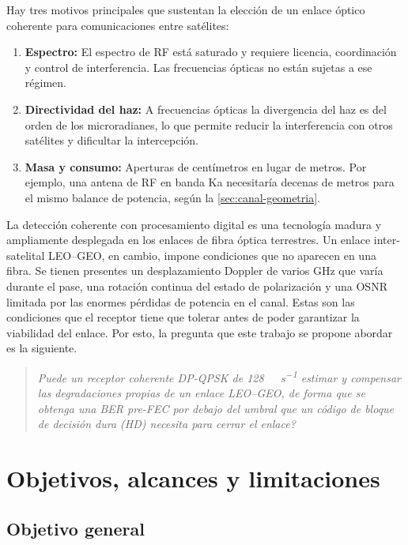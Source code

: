 Hay tres motivos principales que sustentan la elecci\'on de un enlace \'optico
coherente para comunicaciones entre sat\'elites:

\begin{enumerate}
  \item \textbf{Espectro:} El espectro de RF est\'a saturado y requiere
        licencia, coordinaci\'on y control de interferencia. Las frecuencias
        \'opticas no est\'an sujetas a ese r\'egimen.
  \item \textbf{Directividad del haz:} A frecuencias \'opticas la divergencia
        del haz es del orden de los microradianes, lo que permite reducir la
        interferencia con otros sat\'elites y dificultar la intercepci\'on.
  \item \textbf{Masa y consumo:} Aperturas de cent\'imetros en lugar de metros.
        Por ejemplo, una antena de RF en banda Ka necesitar\'ia decenas de
        metros para el mismo balance de potencia, seg\'un la
        \cref{sec:canal-geometria}.
\end{enumerate}

La detecci\'on coherente con procesamiento digital es una tecnolog\'ia madura y
ampliamente desplegada en los enlaces de fibra \'optica terrestres. Un enlace inter-satelital LEO--GEO, en cambio, impone condiciones
que no aparecen en una fibra. Se tienen presentes un desplazamiento Doppler de
varios \si{\giga\hertz} que var\'ia durante el pase, una rotaci\'on continua
del estado de polarizaci\'on y una OSNR limitada por las enormes p\'erdidas de
potencia en el canal. Estas son las condiciones que el receptor tiene que
tolerar antes de poder garantizar la viabilidad del enlace. Por esto, la pregunta que este trabajo
se propone abordar es la siguiente.

\begin{quote}
\emph{\textquestiondown Puede un receptor coherente DP-QPSK de
\SI{128}{\giga\bit\per\second} estimar y compensar las degradaciones propias de
un enlace LEO--GEO, de forma que se obtenga una BER pre-FEC por
debajo del umbral que un c\'odigo de bloque de decisi\'on dura (HD) necesita para
cerrar el enlace?}
\end{quote}

\section{Objetivos, alcances y limitaciones}
\label{sec:intro-objetivos}

\subsection*{Objetivo general}

